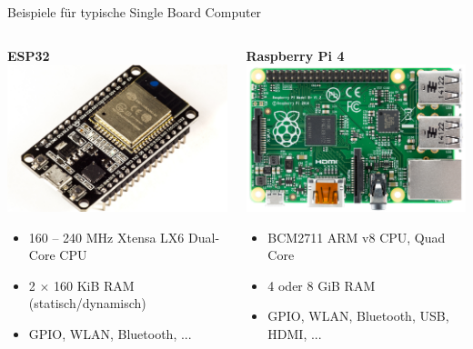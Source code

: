 {\begin{frame}{Beispiele für typische Single Board Computer}
    \bigskip

    \begin{columns}
        \begin{column}[b]{.5\textwidth}
            \textbf{ESP32} \\
            \smallskip
            \includegraphics[width=.5\textwidth]{img/sbc-esp32}

            \begin{itemize}
                \setlength{\itemindent}{-1em}
                \setlength\itemsep{0em}
                \item 160 -- 240 MHz Xtensa LX6 Dual-Core CPU
                \item 2 $\times$ 160 KiB RAM (statisch/dynamisch)
                \item GPIO, WLAN, Bluetooth, ...
            \end{itemize}
        \end{column}

        \begin{column}[b]{.5\textwidth}
            \textbf{Raspberry Pi 4} \\
            \smallskip
            \includegraphics[width=.5\textwidth]{img/sbc-raspberrypi}

            \begin{itemize}
                \setlength{\itemindent}{-1em}
                \setlength\itemsep{0em}
                \item BCM2711 ARM v8 CPU, Quad Core
                \item 4 oder 8 GiB RAM
                \item GPIO, WLAN, Bluetooth, USB, HDMI, ...
            \end{itemize}
        \end{column}
    \end{columns}
\end{frame}
}

